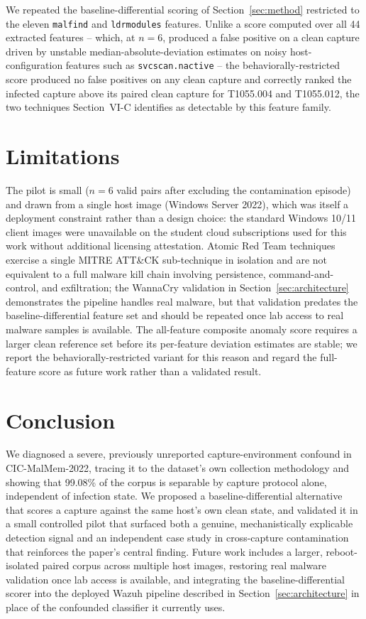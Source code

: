 \documentclass[conference]{IEEEtran}
\begin{document}
We repeated the baseline-differential scoring of Section~\ref{sec:method}
restricted to the eleven \texttt{malfind} and \texttt{ldrmodules} features.
Unlike a score computed over all 44 extracted features -- which, at $n=6$,
produced a false positive on a clean capture driven by unstable
median-absolute-deviation estimates on noisy host-configuration features such
as \texttt{svcscan.nactive} -- the behaviorally-restricted score produced no
false positives on any clean capture and correctly ranked the infected capture
above its paired clean capture for T1055.004 and T1055.012, the two
techniques Section~VI-C identifies as detectable by this feature family.

\section{Limitations}

The pilot is small ($n=6$ valid pairs after excluding the contamination
episode) and drawn from a single host image (Windows Server 2022), which was
itself a deployment constraint rather than a design choice: the standard
Windows 10/11 client images were unavailable on the student cloud
subscriptions used for this work without additional licensing attestation.
Atomic Red Team techniques exercise a single MITRE ATT\&CK sub-technique in
isolation and are not equivalent to a full malware kill chain involving
persistence, command-and-control, and exfiltration; the WannaCry validation in
Section~\ref{sec:architecture} demonstrates the pipeline handles real malware,
but that validation predates the baseline-differential feature set and should
be repeated once lab access to real malware samples is available. The
all-feature composite anomaly score requires a larger clean reference set
before its per-feature deviation estimates are stable; we report the
behaviorally-restricted variant for this reason and regard the full-feature
score as future work rather than a validated result.

\section{Conclusion}

We diagnosed a severe, previously unreported capture-environment confound in
CIC-MalMem-2022, tracing it to the dataset's own collection methodology and
showing that 99.08\% of the corpus is separable by capture protocol alone,
independent of infection state. We proposed a baseline-differential
alternative that scores a capture against the same host's own clean state, and
validated it in a small controlled pilot that surfaced both a genuine,
mechanistically explicable detection signal and an independent case study in
cross-capture contamination that reinforces the paper's central finding. Future
work includes a larger, reboot-isolated paired corpus across multiple host
images, restoring real malware validation once lab access is available, and
integrating the baseline-differential scorer into the deployed Wazuh pipeline
described in Section~\ref{sec:architecture} in place of the confounded
classifier it currently uses.
\end{document}
